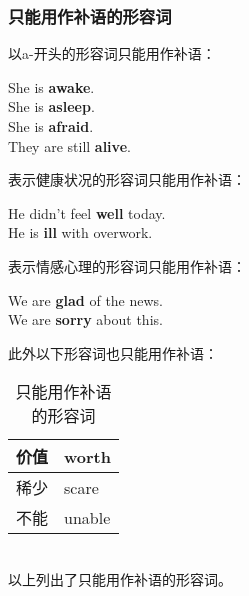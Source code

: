 \documentclass[UTF8]{ctexart}
\newcommand{\littf}[1]{{\hspace{3pt}\ttfamily #1}}
\begin{document}
\newpage

\subsubsection{只能用作补语的形容词}
    以\littf{a-}开头的形容词只能用作补语：
    \begin{center}
        \ttfamily\large
        She is \textbf{awake}.\\[3mm]
        She is \textbf{asleep}.\\[3mm]
        She is \textbf{afraid}.\\[3mm]
        They are still \textbf{alive}.\\[6mm]
    \end{center}
    表示健康状况的形容词只能用作补语：
    \begin{center}
        \ttfamily\large
        He didn't feel \textbf{well} today.\\[3mm]
        He is \textbf{ill} with overwork.\\[6mm]
    \end{center}
    表示情感心理的形容词只能用作补语：
    \begin{center}
        \ttfamily\large
        We are \textbf{glad} of the news.\\[3mm]
        We are \textbf{sorry} about this.\\[6mm]
    \end{center}
    此外以下形容词也只能用作补语：
    \begin{table}[h]
        \begin{center}
            \ttfamily
            \begin{tabular}{p{80pt}|p{100pt}}
                \hline
                价值&worth\\ \hline
                稀少&scare\\ \hline
                不能&unable\\ \hline
            \end{tabular}
            \rmfamily
            \caption{只能用作补语的形容词}
        \end{center}
    \end{table}\\
    以上列出了只能用作补语的形容词。

\newpage
\end{document}
